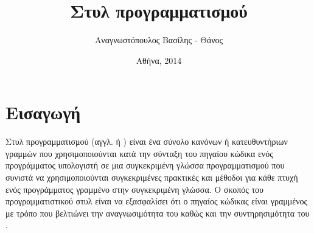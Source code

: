 \documentclass{assignment}
\title{Στυλ προγραμματισμού}
\date{Αθήνα, 2014}
\author{Αναγνωστόπουλος Βασίλης - Θάνος}
\begin{document}
\maketitle

\setcounter{page}{1} 

\pagestyle{plain}


\tableofcontents
\newpage
{}
\listoffigures

\listoftables

\newpage

\pagestyle{fancy}
\setcounter{page}{1} 







\section{Εισαγωγή}




Στυλ προγραμματισμού (αγγλ.  ή ) είναι ένα σύνολο κανόνων ή κατευθυντήριων γραμμών που χρησιμοποιούνται κατά την σύνταξη του πηγαίου κώδικα ενός προγράμματος υπολογιστή σε μια συγκεκριμένη γλώσσα προγραμματισμού που συνιστά να χρησιμοποιούνται συγκεκριμένες πρακτικές και μέθοδοι για κάθε πτυχή ενός προγράμματος γραμμένο στην συγκεκριμένη γλώσσα. Ο σκοπός του προγραμματιστικού στυλ είναι να εξασφαλίσει ότι ο πηγαίος κώδικας είναι γραμμένος με τρόπο που βελτιώνει την αναγνωσιμότητα του καθώς και την συντηρησιμότητα του \cite{wiki:coding_convetions,wiki:Programming_style,ala2004supporting,Mohan,Oman}.
\end{document}
